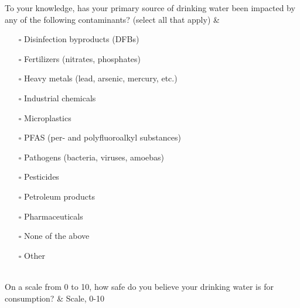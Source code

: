 \documentclass[
]{article}
\begin{document}
\begin{longtblr}[         %
caption={},
entry=none,label=none,
note{1}={Matrix style question.},
label=tblr:quest,
caption={Survey questions.},
]
To your knowledge, has your primary source of drinking water been impacted by any of the following contaminants? (select all that apply)                                                                                                                                                                                                                                                                                                                                     & \begin{itemize}[nosep]    \item[$\square$] Disinfection byproducts (DFBs)    \item[$\square$] Fertilizers (nitrates, phosphates)    \item[$\square$] Heavy metals (lead, arsenic, mercury, etc.)    \item[$\square$] Industrial chemicals    \item[$\square$] Microplastics    \item[$\square$] PFAS (per- and polyfluoroalkyl substances)    \item[$\square$] Pathogens (bacteria, viruses, amoebas)    \item[$\square$] Pesticides    \item[$\square$] Petroleum products    \item[$\square$] Pharmaceuticals    \item[$\square$] None of the above    \item[$\square$] Other    \end{itemize} \\
On a scale from 0 to 10, how safe do you believe your drinking water is for consumption?                                                                                                                                                                                                                                                                                                                                                                                     & Scale, 0-10                                                                                                                                                                                                                                                                                                                                                                                                                                                                                                                                                                                                                                          \\

\end{longtblr}
\end{document}
